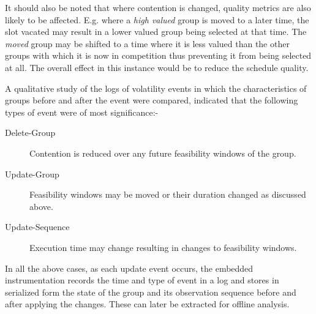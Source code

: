 It should also be noted that where contention is changed, quality metrics are also likely to be affected. E.g. where a \emph{high valued} group is moved to a later time, the slot vacated may result in a lower valued group being selected at that time. The \emph{moved} group may be shifted to a time where it is less valued than the other groups with which it is now in competition thus preventing it from being selected at all. The overall effect in this instance would be to reduce the schedule quality.

A qualitative study of the logs of volatility events in which the characteristics of groups before and after the event were compared, indicated that the following types of event were of most significance:-
\begin{description}
\item [Delete-Group] Contention is reduced over any future feasibility windows of the group.
\item [Update-Group] Feasibility windows may be moved or their duration changed as discussed above. 
\item [Update-Sequence] Execution time may change resulting in changes to feasibility windows. 
\end{description}

In all the above cases, as each update event occurs, the embedded instrumentation records the time and type of event in a log and stores in serialized form the state of the group and its observation sequence before and after applying the changes. These can later be extracted for offline analysis.


